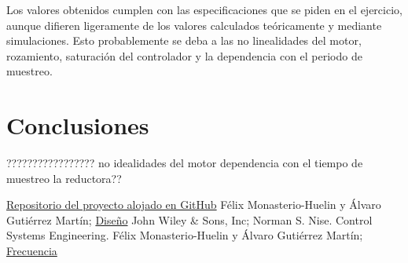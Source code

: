 \documentclass[a4paper]{article}
\begin{document}
Los valores obtenidos cumplen con las especificaciones que se piden en el ejercicio, aunque difieren ligeramente de los valores calculados teóricamente y mediante simulaciones. Esto probablemente se deba a las no linealidades del motor, rozamiento, saturación del controlador y la dependencia con el periodo de muestreo.


\section{Conclusiones}

?????????????????
no idealidades del motor
dependencia con el tiempo de muestreo
la reductora??


\begin{thebibliography}{9}
 \href{https://github.com/avicarioe/telelabo}{Repositorio del proyecto alojado en GitHub}
 Félix Monasterio-Huelin y Álvaro Gutiérrez Martín;
\href{http://www.robolabo.etsit.upm.es/asignaturas/seco/apuntes/design.pdf}{Diseño}
 John Wiley \& Sons, Inc; Norman S. Nise. Control Systems Engineering.
 Félix Monasterio-Huelin y Álvaro Gutiérrez Martín;
\href{http://robolabo.etsit.upm.es/asignaturas/seco/apuntes/frecuencia.pdf} {Frecuencia}


\end{thebibliography}
\end{document}
